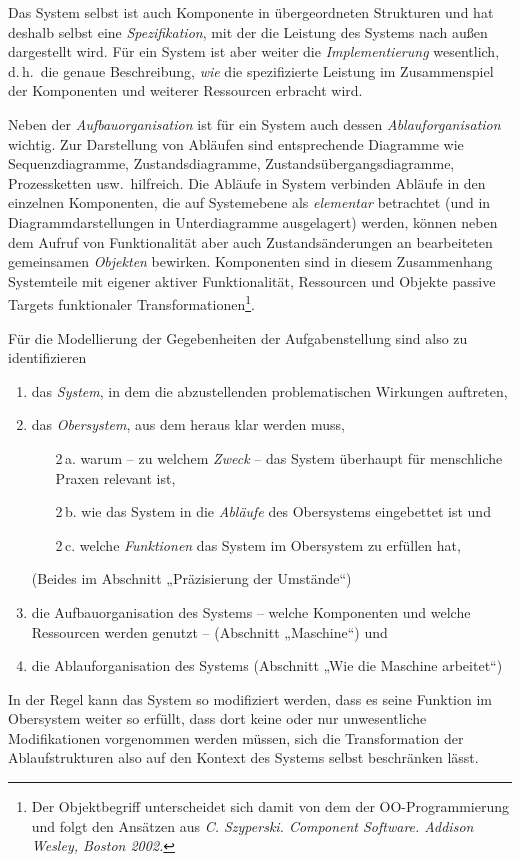 \documentclass[11pt,a4paper]{article}
\begin{document}
Das System selbst ist auch Komponente in übergeordneten Strukturen und hat
deshalb selbst eine \emph{Spezifikation}, mit der die Leistung des Systems
nach außen dargestellt wird. Für ein System ist aber weiter die
\emph{Implementierung} wesentlich, d.\,h.\ die genaue Beschreibung, \emph{wie}
die spezifizierte Leistung im Zusammenspiel der Komponenten und weiterer
Ressourcen erbracht wird.

Neben der \emph{Aufbauorganisation} ist für ein System auch dessen
\emph{Ablauforganisation} wichtig. Zur Darstellung von Abläufen sind
entsprechende Diagramme wie Sequenzdiagramme, Zustandsdiagramme,
Zustandsübergangsdiagramme, Prozessketten usw.\ hilfreich. Die Abläufe in
System verbinden Abläufe in den einzelnen Komponenten, die auf Systemebene als
\emph{elementar} betrachtet (und in Diagrammdarstellungen in Unterdiagramme
ausgelagert) werden, können neben dem Aufruf von Funktionalität aber auch
Zustandsänderungen an bearbeiteten gemeinsamen \emph{Objekten} bewirken.
Komponenten sind in diesem Zusammenhang Systemteile mit eigener aktiver
Funktionalität, Ressourcen und Objekte passive Targets funktionaler
Transformationen\footnote{Der Objektbegriff unterscheidet sich damit von dem
  der OO-Programmierung und folgt den Ansätzen aus \emph{C. Szyperski.
    Component Software. Addison Wesley, Boston 2002.}}.

Für die Modellierung der Gegebenheiten der Aufgabenstellung sind also zu
identifizieren 
\begin{enumerate}
\item das \emph{System}, in dem die abzustellenden problematischen Wirkungen
  auftreten,
\item das \emph{Obersystem}, aus dem heraus klar werden muss,
\begin{enumerate}
\item [2\,a.] warum -- zu welchem \emph{Zweck} -- das System überhaupt für
  menschliche Praxen relevant ist,
\item [2\,b.] wie das System in die \emph{Abläufe} des Obersystems eingebettet
  ist und
\item [2\,c.] welche \emph{Funktionen} das System im Obersystem zu erfüllen
  hat,
\end{enumerate}
(Beides im Abschnitt „Präzisierung der Umstände“)
\item die Aufbauorganisation des Systems -- welche Komponenten und welche
  Ressourcen werden genutzt -- (Abschnitt „Maschine“) und
\item die Ablauforganisation des Systems (Abschnitt „Wie die Maschine
  arbeitet“)
\end{enumerate}
In der Regel kann das System so modifiziert werden, dass es seine Funktion im
Obersystem weiter so erfüllt, dass dort keine oder nur unwesentliche
Modifikationen vorgenommen werden müssen, sich die Transformation der
Ablaufstrukturen also auf den Kontext des Systems selbst beschränken lässt.
\end{document}
